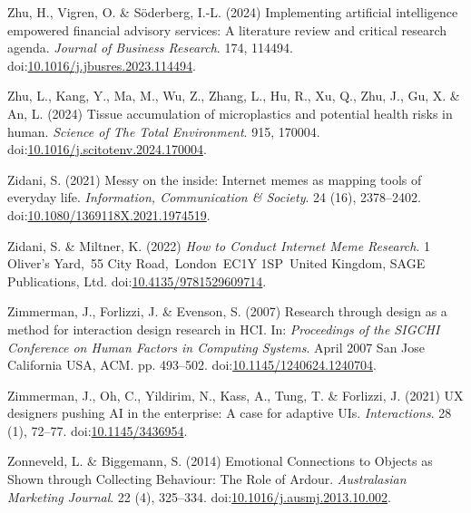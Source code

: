 \documentclass[
  letterpaper,
  DIV=11,
  numbers=noendperiod]{scrartcl}
\newlength{\cslhangindent}
\newenvironment{CSLReferences}[2] %
 {\begin{list}{}{%
  \setlength{\itemindent}{0pt}
  \setlength{\leftmargin}{0pt}
  \setlength{\parsep}{0pt}
  \ifodd #1
   \setlength{\leftmargin}{\cslhangindent}
   \setlength{\itemindent}{-1\cslhangindent}
  \fi
  \setlength{\itemsep}{#2\baselineskip}}}
 {\end{list}}
\begin{document}
\begin{CSLReferences}{0}{1}
Zhu, H., Vigren, O. \& Söderberg, I.-L. (2024) Implementing artificial
intelligence empowered financial advisory services: {A} literature
review and critical research agenda. \emph{Journal of Business
Research}. 174, 114494.
doi:\href{https://doi.org/10.1016/j.jbusres.2023.114494}{10.1016/j.jbusres.2023.114494}.

Zhu, L., Kang, Y., Ma, M., Wu, Z., Zhang, L., Hu, R., Xu, Q., Zhu, J.,
Gu, X. \& An, L. (2024) Tissue accumulation of microplastics and
potential health risks in human. \emph{Science of The Total
Environment}. 915, 170004.
doi:\href{https://doi.org/10.1016/j.scitotenv.2024.170004}{10.1016/j.scitotenv.2024.170004}.

Zidani, S. (2021) Messy on the inside: Internet memes as mapping tools
of everyday life. \emph{Information, Communication \& Society}. 24 (16),
2378--2402.
doi:\href{https://doi.org/10.1080/1369118X.2021.1974519}{10.1080/1369118X.2021.1974519}.

Zidani, S. \& Miltner, K. (2022) \emph{How to {Conduct Internet Meme
Research}}. 1 Oliver's Yard,~55 City Road,~London~EC1Y 1SP~United
Kingdom, SAGE Publications, Ltd.
doi:\href{https://doi.org/10.4135/9781529609714}{10.4135/9781529609714}.

Zimmerman, J., Forlizzi, J. \& Evenson, S. (2007) Research through
design as a method for interaction design research in {HCI}. In:
\emph{Proceedings of the {SIGCHI Conference} on {Human Factors} in
{Computing Systems}}. April 2007 San Jose California USA, ACM. pp.
493--502.
doi:\href{https://doi.org/10.1145/1240624.1240704}{10.1145/1240624.1240704}.

Zimmerman, J., Oh, C., Yildirim, N., Kass, A., Tung, T. \& Forlizzi, J.
(2021) {UX} designers pushing {AI} in the enterprise: A case for
adaptive {UIs}. \emph{Interactions}. 28 (1), 72--77.
doi:\href{https://doi.org/10.1145/3436954}{10.1145/3436954}.

Zonneveld, L. \& Biggemann, S. (2014) Emotional {Connections} to
{Objects} as {Shown} through {Collecting Behaviour}: {The Role} of
{Ardour}. \emph{Australasian Marketing Journal}. 22 (4), 325--334.
doi:\href{https://doi.org/10.1016/j.ausmj.2013.10.002}{10.1016/j.ausmj.2013.10.002}.


\end{CSLReferences}
\end{document}
